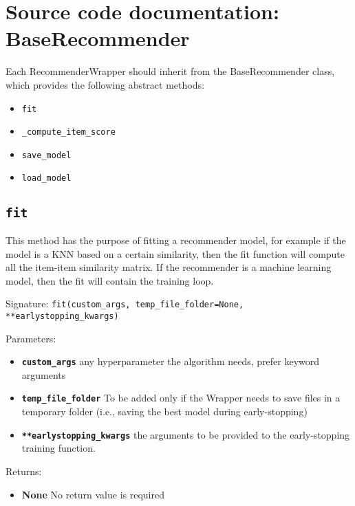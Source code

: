 
\section{Source code documentation: BaseRecommender}
\label{sec:source_documentation_BaseRecommender}

Each RecommenderWrapper should inherit from the BaseRecommender class, which provides the following abstract methods:

\begin{itemize}
    \item \texttt{fit}
    \item \texttt{\_compute\_item\_score}
    \item \texttt{save\_model}
    \item \texttt{load\_model}
\end{itemize}


\subsection{\texttt{fit}}
This method has the purpose of fitting a recommender model, for example if the model is a KNN based on a certain similarity, then the fit function will compute all the item-item similarity matrix. If the recommender is a machine learning model, then the fit will contain the training loop.

Signature: \texttt{fit(custom\_args, temp\_file\_folder=None, **earlystopping\_kwargs)}

Parameters:
\begin{itemize}
    \item \textbf{\texttt{custom\_args}} any hyperparameter the algorithm needs, prefer keyword arguments
    \item \textbf{\texttt{temp\_file\_folder}} To be added only if the Wrapper needs to save files in a temporary folder (i.e., saving the best model during early-stopping)
    \item \textbf{\texttt{**earlystopping\_kwargs}} the arguments to be provided to the early-stopping training function.
\end{itemize}

Returns:
\begin{itemize}
    \item \textbf{None} No return value is required
\end{itemize}


